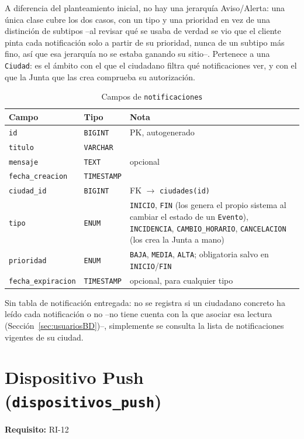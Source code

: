 A diferencia del planteamiento inicial, no hay una jerarquía Aviso/Alerta: una única clase cubre los dos casos, con un tipo y una prioridad en vez de una distinción de subtipos --al revisar qué se usaba de verdad se vio que el cliente pinta cada notificación solo a partir de su prioridad, nunca de un subtipo más fino, así que esa jerarquía no se estaba ganando su sitio--. Pertenece a una \texttt{Ciudad}: es el ámbito con el que el ciudadano filtra qué notificaciones ver, y con el que la Junta que las crea comprueba su autorización.

\begin{table}[H]
\centering
\begin{tabular}{|l|l|p{7cm}|}
\hline
\textbf{Campo} & \textbf{Tipo} & \textbf{Nota} \\
\hline
\texttt{id} & \texttt{BIGINT} & PK, autogenerado \\
\hline
\texttt{titulo} & \texttt{VARCHAR} &  \\
\hline
\texttt{mensaje} & \texttt{TEXT} & opcional \\
\hline
\texttt{fecha\_creacion} & \texttt{TIMESTAMP} &  \\
\hline
\texttt{ciudad\_id} & \texttt{BIGINT} & FK $\to$ \texttt{ciudades(id)} \\
\hline
\texttt{tipo} & \texttt{ENUM} & \texttt{INICIO}, \texttt{FIN} (los genera el propio sistema al cambiar el estado de un \texttt{Evento}), \texttt{INCIDENCIA}, \texttt{CAMBIO\_HORARIO}, \texttt{CANCELACION} (los crea la Junta a mano) \\
\hline
\texttt{prioridad} & \texttt{ENUM} & \texttt{BAJA}, \texttt{MEDIA}, \texttt{ALTA}; obligatoria salvo en \texttt{INICIO}/\texttt{FIN} \\
\hline
\texttt{fecha\_expiracion} & \texttt{TIMESTAMP} & opcional, para cualquier tipo \\
\hline
\end{tabular}
\caption{Campos de \texttt{notificaciones}}
\end{table}

Sin tabla de notificación entregada: no se registra si un ciudadano concreto ha leído cada notificación o no --no tiene cuenta con la que asociar esa lectura (Sección~\ref{sec:usuariosBD})--, simplemente se consulta la lista de notificaciones vigentes de su ciudad.

\section{Dispositivo Push (\texttt{dispositivos\_push})}
\textbf{Requisito:} RI-12

